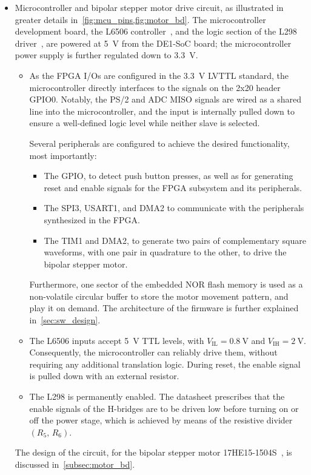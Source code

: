 \begin{itemize}
    \item Microcontroller and bipolar stepper motor drive circuit, as illustrated in greater details in~\cref{fig:mcu_pins,fig:motor_bd}.
    The microcontroller development board, the L6506 controller~\cite{l6506}, and the logic section of the L298 driver~\cite{l298}, are powered at \qty{5}{\V} from the DE1-SoC board; the microcontroller power supply is further regulated down to \qty{3.3}{\V}.
    \begin{itemize}
        \item As the FPGA I/Os are configured in the \qty{3.3}{\V} LVTTL standard, the microcontroller directly interfaces to the signals on the 2x20 header GPIO0. Notably, the PS/2 and ADC MISO signals are wired as a shared line into the microcontroller, and the input is internally pulled down to ensure a well-defined logic level while neither slave is selected.

        Several peripherals are configured to achieve the desired functionality, most importantly:
        \begin{itemize}
            \item The GPIO, to detect push button presses, as well as for generating reset and enable signals for the FPGA subsystem and its peripherals.
            \item The SPI3, USART1, and DMA2 to communicate with the peripherals synthesized in the FPGA.
            \item The TIM1 and DMA2, to generate two pairs of complementary square waveforms, with one pair in quadrature to the other, to drive the bipolar stepper motor.
        \end{itemize}
        Furthermore, one sector of the embedded NOR flash memory is used as a non-volatile circular buffer to store the motor movement pattern, and play it on demand. The architecture of the firmware is further explained in~\cref{sec:sw_design}.
        
        \item The L6506 inputs accept \qty{5}{\V} TTL levels, with $V_\text{IL} = \qty{0.8}{\V}$ and $V_\text{IH} = \qty{2}{\V}$. Consequently, the microcontroller can reliably drive them, without requiring any additional translation logic. During reset, the enable signal is pulled down with an external resistor.

        \item The L298 is permanently enabled. The datasheet prescribes that the enable signals of the H-bridges are to be driven low before turning on or off the power stage, which is achieved by means of the resistive divider $(R_5,\,R_6)$. 
    \end{itemize}
    The design of the circuit, for the bipolar stepper motor 17HE15-1504S~\cite{stepp}, is discussed in~\cref{subsec:motor_bd}.
\end{itemize}

